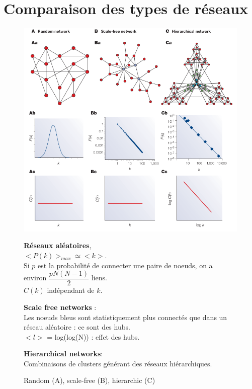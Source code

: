\section{Comparaison des types de réseaux}
\begin{figure}[h!]
	\raggedleft
	\begin{minipage}{0.60\linewidth}
		\includegraphics[width=\linewidth]{Nwk.png}
		\caption{Random (A), scale-free (B), hierarchic (C)}
	\end{minipage}
	\raggedright
	\begin{minipage}{0.35\linewidth}
		
		\textbf{Réseaux aléatoires},\\ $<P(k)>_{max} \simeq <k>$.\\ Si $p$ est la probabilité de connecter une paire de noeuds, on a environ $\dfrac{pN(N-1)}{2}$ liens. \\$C(k)$ indépendant de $k$.
		
		\medskip
		\textbf{Scale free networks} :\\
		Les noeuds bleus sont statistiquement plus connectés que dans un réseau aléatoire : ce sont des hubs.\\
		$<l>$ = log(log(N)) : effet des hubs.
		
		\medskip
		\textbf{Hierarchical networks}:\\
		Combinaisons de clusters générant des réseaux hiérarchiques.
		
	\end{minipage}			
\end{figure}

